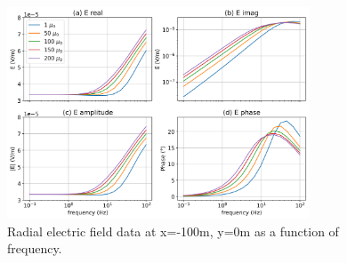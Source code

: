 \begin{figure}
    \begin{center}
    \includegraphics[width=0.8\textwidth]{figures/data-100m-frequency.png}
    \end{center}
\caption{
    Radial electric field data at x=-100m, y=0m as a function of frequency.
}
\label{fig:data-100m-frequency}
\end{figure}



